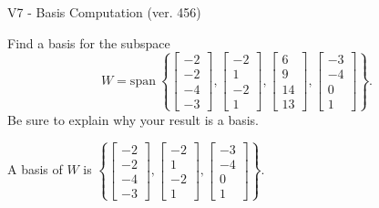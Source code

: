 \begin{exercise}
  \begin{exerciseTitle}V7 - Basis Computation (ver. 456)\end{exerciseTitle}
  \begin{exerciseStatement}
    Find a basis for the subspace 
\[W=\mathrm{span}\ \left\{\left[\begin{array}{r}
-2 \\
-2 \\
-4 \\
-3
\end{array}\right] , \left[\begin{array}{r}
-2 \\
1 \\
-2 \\
1
\end{array}\right] , \left[\begin{array}{r}
6 \\
9 \\
14 \\
13
\end{array}\right] , \left[\begin{array}{r}
-3 \\
-4 \\
0 \\
1
\end{array}\right]\right\}.\]
 Be sure to explain why your result is a basis.


  \end{exerciseStatement}
  \begin{exerciseAnswer}
   A basis of \(W\) is  \(\left\{\left[\begin{array}{r}
-2 \\
-2 \\
-4 \\
-3
\end{array}\right] , \left[\begin{array}{r}
-2 \\
1 \\
-2 \\
1
\end{array}\right] , \left[\begin{array}{r}
-3 \\
-4 \\
0 \\
1
\end{array}\right]\right\}\).
  


  \end{exerciseAnswer}
\end{exercise}